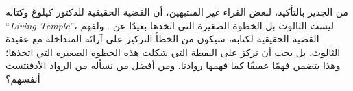 من الجدير بالتأكيد، لبعض القراء غير المنتبهين، أن القضية الحقيقية للدكتور كيلوغ وكتابه “\textit{Living Temple}”، ليست الثالوث بل الخطوة الصغيرة التي اتخذها بعيدًا عن . ولفهم القضية الحقيقية لكتابه، سيكون من الخطأ التركيز على آرائه المتداخلة مع عقيدة الثالوث. بل يجب أن نركز على النقطة التي شكلت هذه الخطوة الصغيرة التي اتخذها؛ وهذا يتضمن فهمًا عميقًا  كما فهمها روادنا. ومن أفضل من نسأله من الرواد الأدفنتست أنفسهم؟


